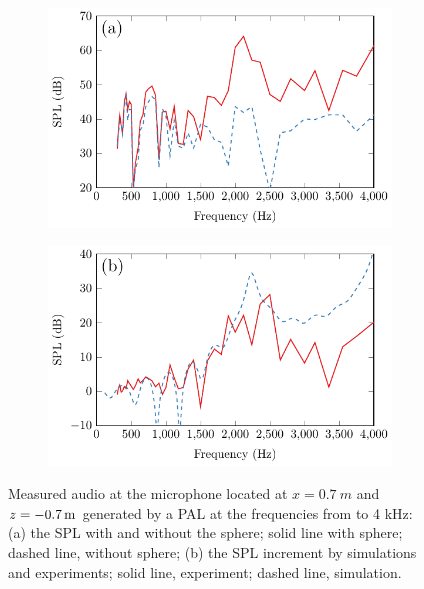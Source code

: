 \begin{figure}[!htb]
    \centering
    \begin{subfigure}{0.49\textwidth}
        \centering
        \includegraphics[width = \textwidth]{fig/ExpResult_211013At_ExpWithWoutSpehre_211013Au.pdf}
    \end{subfigure}
    \begin{subfigure}{0.49\textwidth}
        \centering
        \includegraphics[width = \textwidth]{fig/ExpResult_IncreSimExp_211211Z.pdf}
    \end{subfigure}
    \caption{Measured audio  at the microphone located at $x = \SI{0.7}{m}$ and $z = \SI{- 0.7}{ m}$ generated by a PAL at the frequencies from  to 4 kHz: (a) the SPL with and without the sphere; solid line with sphere; dashed line, without sphere; (b) the SPL increment by simulations and experiments; solid line, experiment; dashed line, simulation. }
    \label{fig:scat_exp_result_1d}
\end{figure}

